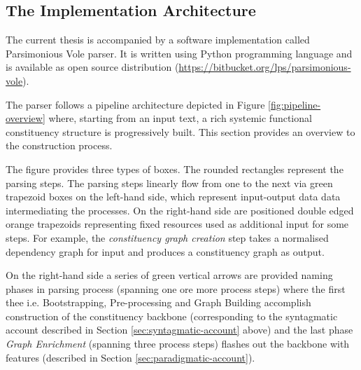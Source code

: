 \subsection{The Implementation Architecture}
\label{sec:architecture}
The current thesis is accompanied by a software implementation called Parsimonious Vole parser. It is written using Python programming language and is available as open source distribution (\url{https://bitbucket.org/lps/parsimonious-vole}).

The parser follows a pipeline architecture depicted in Figure \ref{fig:pipeline-overview} where, starting from an input text, a rich systemic functional constituency structure is progressively built. This section provides an overview to the construction process. 

The figure provides three types of boxes. The rounded rectangles represent the parsing steps. 
The parsing steps linearly flow from one to the next via green trapezoid boxes on the left-hand side, which represent input-output data data intermediating the processes. On the right-hand side are positioned double edged orange trapezoids representing fixed resources used as additional input for some steps. For example, the \textit{constituency graph creation} step takes a normalised dependency graph for input and produces a constituency graph as output.

On the right-hand side a series of green vertical arrows are provided naming phases in parsing process (spanning one ore more process steps) where the first thee  i.e. Bootstrapping, Pre-processing and Graph Building accomplish construction of the constituency backbone (corresponding to the syntagmatic account described in Section \ref{sec:syntagmatic-account} above) and the last phase \textit{Graph Enrichment} (spanning three process steps) flashes out the backbone with features (described in Section \ref{sec:paradigmatic-account}). 

